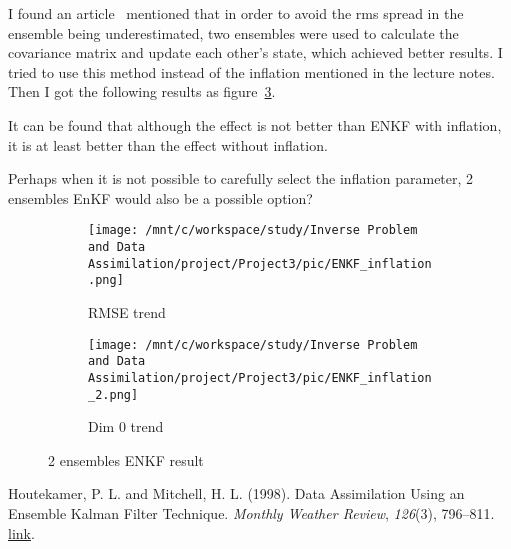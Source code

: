 \documentclass[11pt,reqno]{amsart}
\begin{document}
I found an article~\cite{houtekamer_1998}  mentioned that in order to avoid the rms spread in the ensemble being
 underestimated, two ensembles were used to calculate the covariance matrix and update each other's state, 
 which achieved better results. I tried to use this method instead of the inflation mentioned in the lecture
  notes. Then I got the following results as figure~\ref{fig:2_ensembles_ENKF_result}.

  It can be found that although the effect is not better than ENKF with inflation, it is at least better than the effect without inflation.

  Perhaps when it is not possible to carefully select the inflation parameter, 2 ensembles EnKF would also be a possible option?
  \begin{figure}[htbp]
  \centering
  \begin{subfigure}[t]{0.65\textwidth}
      \centering
      \texttt{[image: /mnt/c/workspace/study/Inverse Problem and Data Assimilation/project/Project3/pic/ENKF\_inflation.png]} %
      \caption{RMSE trend}
      \label{fig:ml-ensemble-20}
  \end{subfigure}
  \vspace{0.5cm}
  
  \begin{subfigure}[t]{0.65\textwidth}
      \centering
      \texttt{[image: /mnt/c/workspace/study/Inverse Problem and Data Assimilation/project/Project3/pic/ENKF\_inflation\_2.png]} %
      \caption{Dim 0 trend}
      \label{fig:ml-ensemble-50}
  \end{subfigure}
  \vspace{0.5cm}

  \caption{2 ensembles ENKF result}
  \label{fig:2_ensembles_ENKF_result}
\end{figure}

\begin{thebibliography}{9}
  Houtekamer, P. L. and Mitchell, H. L. (1998). 
  Data Assimilation Using an Ensemble Kalman Filter Technique. 
  \textit{Monthly Weather Review}, \textit{126}(3), 796--811. 
  \href{https://journals.ametsoc.org/view/journals/mwre/126/3/1520-0493_1998_126_0796_dauaek_2.0.co_2.xml}{link}.
\end{thebibliography}
\end{document}
